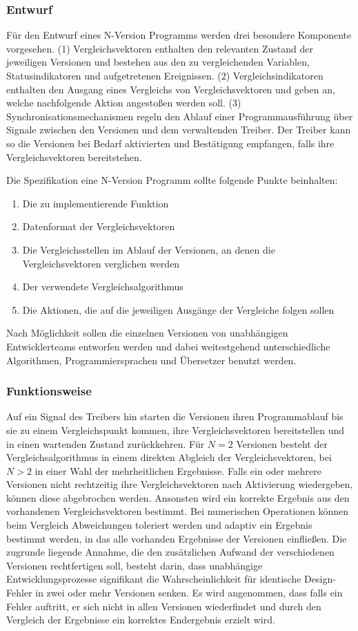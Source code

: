 \subsubsection{Entwurf}
Für den Entwurf eines N-Version Programms werden drei besondere Komponente vorgesehen.
(1) Vergleichsvektoren enthalten den relevanten Zustand der jeweiligen Versionen und bestehen aus den zu vergleichenden Variablen, Statusindikatoren und aufgetretenen Ereignissen.
(2) Vergleichsindikatoren enthalten den Ausgang eines Vergleichs von Vergleichsvektoren und geben an, welche nachfolgende Aktion angestoßen werden soll. 
(3) Synchronisationsmechanismen regeln den Ablauf einer Programmausführung über Signale zwischen den Versionen und dem verwaltenden Treiber. Der Treiber kann so die Versionen bei Bedarf aktivierten und Bestätigung empfangen, falls ihre Vergleichsvektoren bereitstehen.

Die Spezifikation eine N-Version Programm sollte folgende Punkte beinhalten:
\begin{enumerate}
	\item Die zu implementierende Funktion
	\item Datenformat der Vergleichsvektoren
	\item Die Vergleichsstellen im Ablauf der Versionen, an denen die Vergleichsvektoren verglichen werden
	\item Der verwendete Vergleichsalgorithmus
	\item Die Aktionen, die auf die jeweiligen Ausgänge der Vergleiche folgen sollen
\end{enumerate}
%
Nach Möglichkeit sollen die einzelnen Versionen von unabhängigen Entwicklerteams entworfen werden und dabei weitestgehend unterschiedliche Algorithmen, Programmiersprachen und Übersetzer benutzt werden.


\subsubsection{Funktionsweise}

Auf ein Signal des Treibers hin starten die Versionen ihren Programmablauf bis sie zu einem Vergleichspunkt kommen, ihre Vergleichsvektoren bereitstellen und in einen wartenden Zustand zurückkehren.
Für $N = 2$ Versionen besteht der Vergleichsalgorithmus in einem direkten Abgleich der Vergleichsvektoren, bei $N > 2$ in einer Wahl der mehrheitlichen Ergebnisse. Falls ein oder mehrere Versionen nicht rechtzeitig ihre Vergleichsvektoren nach Aktivierung wiedergeben, können diese abgebrochen werden. Ansonsten wird ein korrekte Ergebnis aus den vorhandenen Vergleichsvektoren bestimmt. Bei numerischen Operationen können beim Vergleich Abweichungen toleriert werden und adaptiv ein Ergebnis bestimmt werden, in das alle vorhanden Ergebnisse der Versionen einfließen. 
Die zugrunde liegende Annahme, die den zusätzlichen Aufwand der verschiedenen Versionen rechtfertigen soll, besteht darin, dass unabhängige Entwicklungsprozesse signifikant die Wahrscheinlichkeit für identische Design-Fehler in zwei oder mehr Versionen senken.
Es wird angenommen, dass falls ein Fehler auftritt, er sich nicht in allen Versionen wiederfindet und durch den Vergleich der Ergebnisse ein korrektes Endergebnis erzielt wird.


